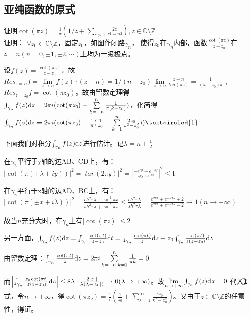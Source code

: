 \subsection{亚纯函数的原式}
\begin{eg}
	\color{blue}证明$\cot (\pi z)=\frac{1}{\pi} (1/z+\sum\limits_{z>1}\frac{2z}{z^2-n^2}),z\in \mathbb{C}\setminus \mathbb{Z}$
	\color{black} \\ 
	证明： $\forall z_0\in \mathbb{C}\setminus \mathbb{Z}$，固定$z_0$，如图作闭路$\gamma_n$，
	使得$z_0$在$\gamma_n$内部，函数$\frac{\cot (\pi z)}{z-z_0}$在$z=n(n=0,\pm 1,\pm 2, \cdots)$上均为一级极点。\par 设$f(z)=\frac{\cot (\pi z)}{z-z_0}$。故$Res_{z=n}f=\lim\limits_{z\to n}f(z)\cdot (z-n)=1/(n-z_0) \lim\limits_{z\to n}\frac{z-n}{tan(\pi z)}=\frac{1}{(n-z_0)\pi}$ , $Res_{z=z_0}f=\cot (\pi z_0)$。故由留数定理得$\int_{\gamma_n}{f(z)\mathrm{d}z}=2\pi i(\cot (\pi z_0)+\sum\limits_{k=-n}^n{\frac{1}{\pi (k-z_0)}})$，化简得$\int_{\gamma_n}{f(z)\di z}=2\pi i(\cot (\pi z_0)-\frac{1}{\pi} (\frac{1}{z_0}+\sum\limits_{k=1}^n{\frac{2z_0}{k^2-z_0^2}}))\textcircled{1}$ \par
	下面我们对积分$\int_{\gamma_n}{f(z)\mathrm{d}z}$进行估计。记$\lambda = n+ \frac{1}{2}$\par
	在$\gamma_n$平行于y轴的边AB、CD上，有：$\left| \cot  (\pi(\pm\lambda +iy))\right|^2=\left| tan(2\pi y)\right| ^2=\left| \frac{-e^{\pi y}+e^{-\pi y}}{e^{\pi y+e^{-\pi y}}} \right|^2 \le 1$\par
	在$\gamma_n$平行于x轴的边AD、BC上，有：$\left| \cot  (\pi(\pm x +i\lambda))\right|^2=\frac{ch^2\pi\lambda - \sin^2 \pi x}{sh^2 \pi \lambda + \sin^2 \pi x}\le \frac{ch^2 \pi \lambda}{sh^2 \pi \lambda}=\frac{e^{2\pi\lambda}+e^{-2\pi\lambda}+2}{e^{2\pi\lambda}+e^{-2\pi\lambda}-2}\to 1 (n\to + \infty)$\par
	故当$n$充分大时，在$\gamma_n$上有$\left| \cot (\pi z)\right| \le 2$\par
	另一方面，$\int_{\gamma_n}{f(z)\mathrm{d}z}=\int_{\gamma_n}\frac{\cot (\pi t)}{z-z_0}\mathrm{d}t=\int_{\gamma_n}\frac{\cot (\pi t)}{z}\mathrm{d}z +z_0\int_{\gamma_n}\frac{\cot (\pi t)}{z(z-z_0)}\mathrm{d}z$\par
	由留数定理：$\int_{\gamma_n}\frac{\cot (\pi t)}{z}\mathrm{d}z=2\pi i\sum\limits_{k=-n,k\neq 0}^n{\frac{1}{\pi k}}=0$\par
	而$\left| \int_{\gamma_n}\frac{z_0 \cot (\pi t)}{z(z-z_0)}\mathrm{d}z \right| \le 8\lambda \cdot \frac{2\left| z_0 \right|}{\lambda(\lambda-\left| z_0 \right|)}\to 0 (\lambda \to + \infty)$。故$\lim\limits_{n\to +\infty}\int_{\gamma_n}{f(z)\mathrm{d}z}=0$
	代入\textcircled{1}式，令$n\to +\infty$，得$\cot (\pi z_o)=\frac{1}{\pi}(\frac{1}{z_0}+\sum\limits_{k=1}^{\infty}{\frac{2z_0}{k^2-z_0^2}})$。又由于$z\in \mathbb{C}\setminus \mathbb{Z}$的任意性，得证。
\end{eg}
